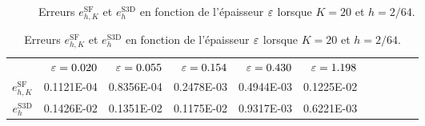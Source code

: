 \begin{figure}[t!]
  \begin{center}
    
    \caption{Erreurs $e_{h,K}^\mathrm{SF}$ et $e_h^\mathrm{S3D}$ en fonction
    de l'épaisseur $\varepsilon$ lorsque $K = 20$ et $h = 2/64$.}
    \label{fig:e-sf-e-s3d-convergence}
  \end{center}
\end{figure}

\begin{table}[t!]
  \caption{Erreurs $e_{h,K}^\mathrm{SF}$ et $e_h^\mathrm{S3D}$ en fonction
    de l'épaisseur $\varepsilon$ lorsque $K = 20$ et $h = 2/64$.}
  \label{tab:e-sf-e-s3d-convergence}
  \begin{center}
    \begin{tabular}{@{}rrrrrrrrrrr@{}}
      \toprule
      & $\varepsilon = 0.020$
      & $\varepsilon = 0.055$
      & $\varepsilon = 0.154$
      & $\varepsilon = 0.430$
      & $\varepsilon = 1.198$ \\
      \cmidrule{2-6}
      $e_{h,K}^\mathrm{SF}$  & \num{0.1121E-04} & \num{0.8356E-04} & \num{0.2478E-03} & \num{0.4944E-03} & \num{0.1225E-02}\\
      $e_h^\mathrm{S3D}$ & \num{0.1426E-02} & \num{0.1351E-02} & \num{0.1175E-02} & \num{0.9317E-03} & \num{0.6221E-03}\\
      \bottomrule
    \end{tabular}
  \end{center}
\end{table}

